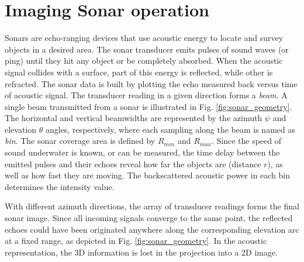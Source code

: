 \documentclass[final,5p,times]{elsarticle}
\begin{document}

\section{Imaging Sonar operation}
\label{sonar:operation}

Sonars are echo-ranging devices that use acoustic energy to locate and survey
objects in a desired area. The sonar transducer emits pulses of sound waves
(or ping) until they hit any object or be completely absorbed. When the
acoustic signal collides with a surface, part of this energy is reflected,
while other is refracted. The sonar data is built by plotting the echo measured back versus time of acoustic signal. The transducer reading in a given direction forms a \textit{beam}. A single beam transmitted from a sonar is illustrated in Fig. \ref{fig:sonar_geometry}. The horizontal and vertical beamwidths are represented by the azimuth $\psi$ and elevation $\theta$ angles, respectively, where each sampling along the beam is named as \textit{bin}. The sonar coverage area is defined by $R_{min}$ and $R_{max}$. Since the speed of sound underwater is known, or can be measured, the time delay between the emitted pulses and their echoes reveal how far the objects are (distance $r$), as well as how fast they are moving. The backscattered acoustic power in each bin determines the intensity value.

With different azimuth directions, the array of transducer readings forms the
final sonar image. Since all incoming signals converge to the same point, the
reflected echoes could have been originated anywhere along the corresponding
elevation arc at a fixed range, as depicted in Fig. \ref{fig:sonar_geometry}.
In the acoustic representation, the 3D information is lost in the projection
into a 2D image.
\end{document}
